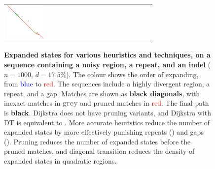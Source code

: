 \begin{figure}[H]
\begin{tabular}{l>{\centering}m{0.12\linewidth}>{\centering}m{0.12\linewidth}>{\centering}m{0.12\linewidth}>{\centering\arraybackslash}m{0.35\linewidth}}
    \includegraphics[scale=0.09]{imgs/comparison/gcsh-dt.png} \\
  \end{tabular}
  \caption[Expanded states for various algorithms complex
      examples]{\textbf{Expanded states for various heuristics and techniques,
      on a sequence containing a noisy region, a repeat, and an indel}
      ($n{=}1000$, $d{=}17.5\%$). The colour shows the order of expanding, from
      \textcolor{blue}{blue} to \textcolor{red}{red}. The sequences include a
      highly divergent region, a repeat, and a gap. Matches are shown as
      \textbf{black diagonals}, with inexact matches in
      \textbf{\textcolor{gray}{grey}} and pruned matches in
      \textcolor{red}{red}. The final path is \textbf{black}. Dijkstra does not
      have pruning variants, and Dijkstra with DT is equivalent to \oldwfa. More
      accurate heuristics reduce the number of expanded states by more
      effectively punishing repeats (\CSH) and gaps (\GCH). Pruning reduces the
      number of expanded states before the pruned matches, and diagonal
      transition reduces the density of expanded states in quadratic regions. }
  \label{GLOBALfig:comparison}
\end{figure}

